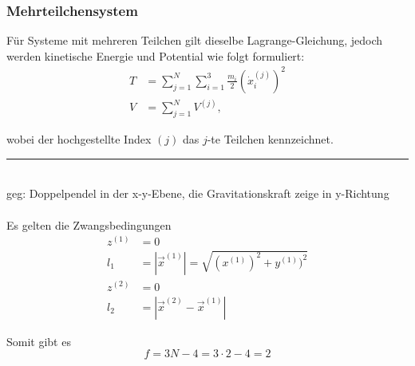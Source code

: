 \documentclass{article}
\newcommand{\lr}[1]{\left(#1\right)}
\begin{document}
\newpage


\subsubsection{Mehrteilchensystem}
Für Systeme mit mehreren Teilchen gilt dieselbe Lagrange-Gleichung, jedoch werden kinetische Energie und Potential wie folgt formuliert:
	\begin{align}
		T &= \sum_{j=1}^N \sum_{i=1}^3 \frac{m_i}{2} \lr{ \dot{x}_i^{(j)} }^2 \\
		 V &= \sum_{j=1}^N V^{(j)},
	\end{align}

wobei der hochgestellte Index $(j)$ das $j$-te Teilchen kennzeichnet.


\newpage


{\color{blue}
\hrule
	\\
	geg: Doppelpendel in der x-y-Ebene, die Gravitationskraft zeige in y-Richtung\\
	\\
	Es gelten die Zwangsbedingungen
		\begin{align*}
			z^{(1)} &= 0 \\
			l_1 &= |\vec{x}^{(1)}| = \sqrt{ (x^{(1)})^2 + y^{(1)})^2 } \\
			z^{(2)} &= 0 \\
			l_2 &= |\vec{x}^{(2)} - \vec{x}^{(1)}|
		\end{align*}
	
	Somit gibt es
		$$f = 3N - 4 = 3\cdot 2 - 4 = 2$$

}
\end{document}
